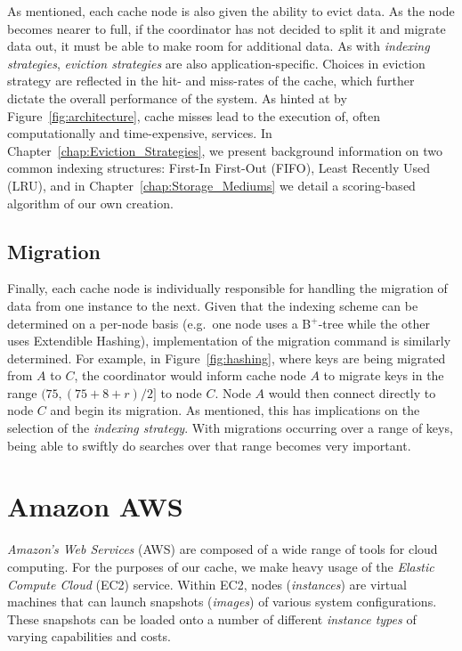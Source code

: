 As mentioned, each cache node is also given the ability to evict data. As the
node becomes nearer to full, if the coordinator has not decided to split it
and migrate data out, it must be able to make room for additional data. As with
\emph{indexing strategies}, \emph{eviction strategies} are also
application-specific. Choices in eviction strategy are reflected in the hit-
and miss-rates of the cache, which further dictate the overall performance of
the system. As hinted at by Figure~\ref{fig:architecture}, cache misses lead to
the execution of, often computationally and time-expensive, services. In
Chapter~\ref{chap:Eviction_Strategies}, we present background information on
two common indexing structures: First-In First-Out (FIFO), Least Recently Used
(LRU), and in Chapter~\ref{chap:Storage_Mediums} we detail a scoring-based
algorithm of our own creation.


\subsection{Migration} %
\label{sub:cache_migration}

Finally, each cache node is individually responsible for handling the migration
of data from one instance to the next. Given that the indexing scheme can be
determined on a per-node basis (e.g.\ one node uses a B$^+$-tree while the
other uses Extendible Hashing), implementation of the migration command is
similarly determined. For example, in Figure~\ref{fig:hashing}, where keys are
being migrated from $A$ to $C$, the coordinator would inform cache node $A$ to
migrate keys in the range $(75,(75 + 8 + r)/2]$ to node $C$. Node $A$ would
then connect directly to node $C$ and begin its migration. As mentioned, this
has implications on the selection of the \emph{indexing strategy}. With
migrations occurring over a range of keys, being able to swiftly do searches
over that range becomes very important.



\section{Amazon AWS} %
\label{sec:Amazon_AWS}
\emph{Amazon's Web Services} (AWS) are composed of a wide range of tools for
cloud computing. For the purposes of our cache, we make heavy usage of the
\emph{Elastic Compute Cloud} (EC2) service. Within EC2, nodes
(\emph{instances}) are virtual machines that can launch snapshots
(\emph{images}) of various system configurations. These snapshots can be loaded
onto a number of different \emph{instance types} of varying capabilities and
costs.

